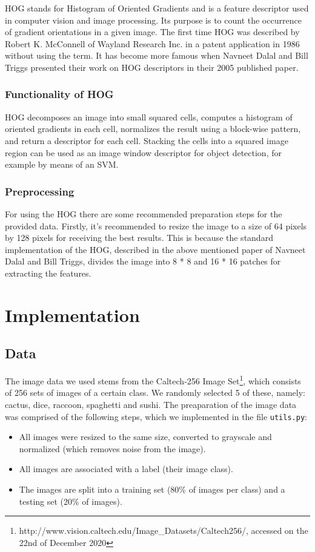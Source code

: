 \documentclass{scrartcl}
\begin{document}
HOG stands for Histogram of Oriented Gradients and is a feature descriptor used in computer vision and image processing. Its purpose is to count the occurrence of gradient orientations in a given image. The first time HOG was described by Robert K. McConnell of Wayland Research Inc. in a patent application in 1986 without using the term. It has become more famous when Navneet Dalal and Bill Triggs presented their work on HOG descriptors in their 2005 published paper.

\subsubsection{Functionality of HOG}

HOG decomposes an image into small squared cells, computes a histogram of oriented gradients in each cell, normalizes the result using a block-wise pattern, and return a descriptor for each cell. Stacking the cells into a squared image region can be used as an image window descriptor for object detection, for example by means of an SVM.

\subsubsection{Preprocessing}

For using the HOG there are some recommended preparation steps for the provided data. Firstly, it's recommended to resize the image to a size of 64 pixels by 128 pixels for receiving the best results. This is because the standard implementation of the HOG, described in the above mentioned paper of Navneet Dalal and Bill Triggs, divides the image into 8 * 8 and 16 * 16 patches for extracting the features.

\section{Implementation}
\subsection{Data}
The image data we used stems from the Caltech-256 Image Set\footnote{http://www.vision.caltech.edu/Image\_Datasets/Caltech256/, accessed on the 22nd of December 2020}, which consists of 256 sets of images of a certain class. We randomly selected 5 of these, namely: cactus, dice, raccoon, spaghetti and sushi. The preaparation of the image data was comprised of the following steps, which we implemented in the file \texttt{utils.py}:
\begin{itemize}
  \item All images were resized to the same size, converted to grayscale and normalized (which removes noise from the image).
  \item All images are associated with a label (their image class).
  \item The images are split into a training set (80\% of images per class) and a testing set (20\% of images).
\end{itemize}
\end{document}
